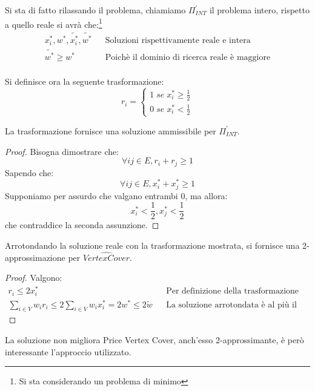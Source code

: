 Si sta di fatto rilassando il problema, chiamiamo $\Pi^\prime_{\mathit{INT}}$ il problema 
intero, rispetto a quello reale si avrà che:\footnote{Si sta considerando un problema di minimo}
\begin{equation}
    \begin{aligned}
        x_i^*, w^*, \tilde{x_i^*}, \tilde{w^*} && \text{Soluzioni rispettivamente reale e intera}\\
        \tilde{w^*} \geq w^* && \text{Poichè il dominio di ricerca reale è maggiore}\\
    \end{aligned}
\end{equation}

Si definisce ora la seguente trasformazione:
\[
    r_i = 
    \begin{cases}
        1\;\mathit{se}\;x_i^* \geq \frac{1}{2}\\
        0\;\mathit{se}\;x_i^* < \frac{1}{2}
    \end{cases}
\]
\begin{remark}
    La trasformazione fornisce una soluzione ammissibile per $\Pi^\prime_{\mathit{INT}}$.
\end{remark}
\begin{proof}
    Bisogna dimostrare che:
    $$\forall ij \in E, r_i + r_j \geq 1$$
    Sapendo che:
    $$\forall ij \in E, x_i^* + x_j^* \geq 1$$
    Supponiamo per assurdo che valgano entrambi 0, ma allora: 
    $$x_i^* < \frac{1}{2}, x_j^* < \frac{1}{2}$$
    che contraddice la seconda assunzione.
\end{proof}
\begin{theorem}
    Arrotondando la soluzione reale con la trasformazione mostrata, 
    si fornisce una 2-approssimazione per $\hat{\mathit{VertexCover}}$.
\end{theorem}
\begin{proof}
    Valgono:
    \begin{equation}
        \begin{aligned}
            r_i \leq 2x_i^* && \text{Per definizione della trasformazione}\\
            \sum_{i\in V} w_ir_i \leq 2 \sum_{i\in V} w_ix_i^* = 2w^* \leq 2\tilde{w} &&\text{La soluzione arrotondata è al più il doppio}
        \end{aligned}
    \end{equation}
\end{proof}
\begin{remark}
    La soluzione non migliora Price Vertex Cover, anch'esso 2-approssimante, è però interessante l'approccio utilizzato.
\end{remark}

